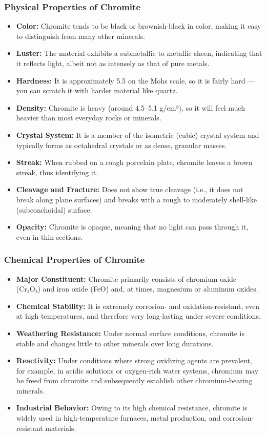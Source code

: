 \documentclass[12pt,a4paper, top=1.9cm, bottom=2.03cm, left=3.81cm, right=1.9cm]{article}
\begin{document}
\subsubsection{Physical Properties of Chromite}
\begin{itemize}[label=\textbullet]  %
\item \textbf{Color:} Chromite tends to be black or brownish-black in color, making it easy to distinguish from many other minerals.
\item \textbf{Luster:} The material exhibits a submetallic to metallic sheen, indicating that it reflects light, albeit not as intensely as that of pure metals.
\item \textbf{Hardness:} It is approximately 5.5 on the Mohs scale, so it is fairly hard — you can scratch it with harder material like quartz.
\item \textbf{Density:} Chromite is heavy (around 4.5–5.1 g/cm³), so it will feel much heavier than most everyday rocks or minerals.
\item \textbf{Crystal System:} It is a member of the isometric (cubic) crystal system and typically forms as octahedral crystals or as dense, granular masses.
\item \textbf{Streak:} When rubbed on a rough porcelain plate, chromite leaves a brown streak, thus identifying it.
\item \textbf{Cleavage and Fracture:} Does not show true cleavage (i.e., it does not break along plane surfaces) and breaks with a rough to moderately shell-like (subconchoidal) surface.
\item \textbf{Opacity:} Chromite is opaque, meaning that no light can pass through it, even in thin sections.
\end{itemize}
\subsubsection{Chemical Properties of Chromite}
\begin{itemize}[label=\textbullet]  %
\item \textbf{Major Constituent:} Chromite primarily consists of chromium oxide (Cr₂O₃) and iron oxide (FeO) and, at times, magnesium or aluminum oxides.
\item \textbf{Chemical Stability:} It is extremely corrosion- and oxidation-resistant, even at high temperatures, and therefore very long-lasting under severe conditions.
\item \textbf{Weathering Resistance:} Under normal surface conditions, chromite is stable and changes little to other minerals over long durations.
\item \textbf{Reactivity:} Under conditions where strong oxidizing agents are prevalent, for example, in acidic solutions or oxygen-rich water systems, chromium may be freed from chromite and subsequently establish other chromium-bearing minerals.
\item \textbf{Industrial Behavior:} Owing to its high chemical resistance, chromite is widely used in high-temperature furnaces, metal production, and corrosion-resistant materials.
\end{itemize}
\end{document}
